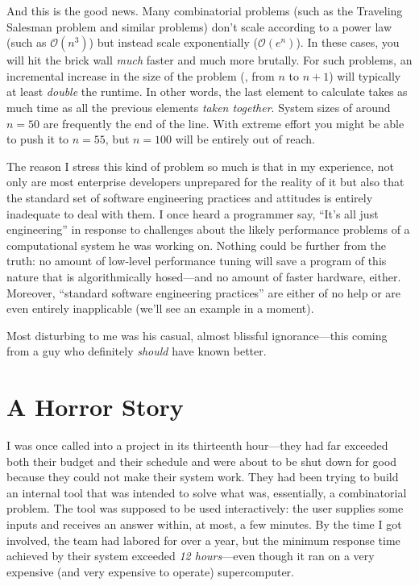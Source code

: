 And this is the good news. Many combinatorial problems (such as the
Traveling Salesman problem and similar problems) don't scale according
to a power law (such as $\mathcal{O}(n^3)$) but instead scale
exponentially ($\mathcal{O}(e^n)$). In these cases, you will hit the
brick wall \emph{much} faster and much more brutally. For such
problems, an incremental increase in the size of the problem (\ie,
from $n$ to $n+1$) will typically at least \emph{double} the runtime.
In other words, the last element to calculate takes as much time as
all the previous elements \emph{taken together}. System sizes of
around $n=50$ are frequently the end of the line.  With extreme effort
you might be able to push it to $n=55$, but $n=100$ will be entirely
out of reach.

The reason I stress this kind of problem so much is that in my
experience, not only are most enterprise developers unprepared for the
reality of it but also that the standard set of software engineering
practices and attitudes is entirely inadequate to deal with them.  I
once heard a programmer say, ``It's all just engineering'' in response
to challenges about the likely performance problems of a computational
system he was working on. Nothing could be further from the truth: no
amount of low-level performance tuning will save a program of this
nature that is algorithmically hosed---and no amount of faster
hardware, either. Moreover, ``standard software engineering
practices'' are either of no help or are even entirely inapplicable
(we'll see an example in a moment).

Most disturbing to me was his casual, almost blissful ignorance---this
coming from a guy who definitely \emph{should} have known better.

\section{A Horror Story}

I was once called into a project in its thirteenth hour---they had far
exceeded both their budget and their schedule and were about to be
shut down for good because they could not make their system work.
They had been trying to build an internal tool that was intended to
solve what was, essentially, a combinatorial problem.  The tool was
supposed to be used interactively: the user supplies some inputs and
receives an answer within, at most, a few minutes. By the time I got
involved, the team had labored for over a year, but the minimum
response time achieved by their system exceeded \emph{12
  hours}---even though it ran on a very expensive (and very expensive
to operate) supercomputer.

